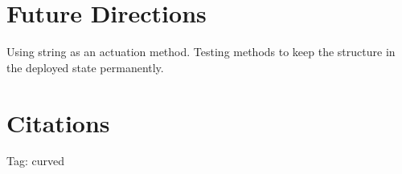 \documentclass{article}
\begin{document}
\section*{Future Directions}
Using string as an actuation method. Testing methods to keep the structure in the deployed
state permanently. 


\section*{Citations}


Tag: curved
\cite{curved}
\end{document}
